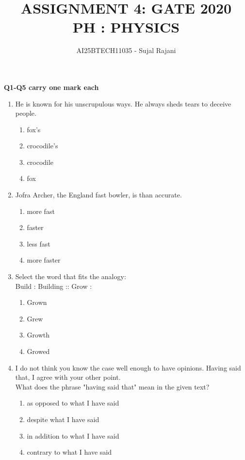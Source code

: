 \documentclass[journal,12pt,onecolumn]{IEEEtran}
\theoremstyle{remark}
\begin{document}
\title{
ASSIGNMENT 4: GATE 2020 \\
    PH : PHYSICS }
\author{AI25BTECH11035 - Sujal Rajani }
\maketitle
\renewcommand{\thefigure}{\theenumi}
\renewcommand{\thetable}{\theenumi}
\textbf{Q1-Q5 carry one mark each} 
\begin{enumerate}
    

\item He is known for his unscrupulous ways. He always sheds \underline{\hspace{1cm}} tears to deceive people.
   
    \begin{enumerate}
        \item fox's
        \item crocodile's
        \item crocodile
        \item fox
    \end{enumerate}
    

    \item Jofra Archer, the England fast bowler, is \underline{\hspace{1cm}} than accurate.
   
    \begin{enumerate}
        \item more fast
        \item faster
        \item less fast
        \item more faster
    \end{enumerate}
   
    \item Select the word that fits the analogy: \\
    Build : Building :: Grow : \underline{\hspace{1cm}}
   
    \begin{enumerate}
        \item Grown
        \item Grew
        \item Growth
        \item Growed
    \end{enumerate}
    

    \item I do not think you know the case well enough to have opinions. Having said that, I agree with your other point.\\
    What does the phrase "having said that" mean in the given text?
    \begin{enumerate}
        \item as opposed to what I have said
        \item despite what I have said
        \item in addition to what I have said
        \item contrary to what I have said
    \end{enumerate}
    


\end{enumerate}
\end{document}
